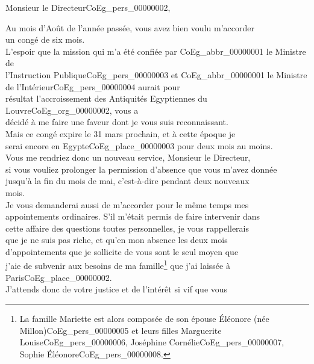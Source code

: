 \documentclass{book}
\begin{document}
\hspace{1cm} Monsieur le Directeur\gls{CoEg_pers_00000002},\\

\par Au mois d’Août de l’année passée, vous avez bien voulu m’accorder\\
un congé de six mois.\\
\indent L’espoir que la mission qui m’a été confiée par \gls{CoEg_abbr_00000001} le Ministre de
\\l’Instruction Publique\gls{CoEg_pers_00000003} et \gls{CoEg_abbr_00000001} le Ministre de l’Intérieur\gls{CoEg_pers_00000004} aurait pour\\
résultat l’accroissement des Antiquités Egyptiennes du Louvre\gls{CoEg_org_00000002}, vous a\\
décidé à me faire une faveur dont je vous suis reconnaissant.\\
\indent Mais ce congé expire le 31 mars prochain, et à cette époque je\\
serai encore en Egypte\gls{CoEg_place_00000003} pour deux mois au moins.\\
\indent Vous me rendriez donc un nouveau service, Monsieur le Directeur,\\
si vous vouliez prolonger la permission d’absence que vous m’avez donnée\\
jusqu’à la fin du mois de mai, c’est-à-dire pendant deux nouveaux\\
mois.\\
\indent Je vous demanderai aussi de m’accorder pour le même temps mes\\
appointements ordinaires. S’il m’était permis de faire intervenir dans\\
cette affaire des questions toutes personnelles, je vous rappellerais\\
que je ne suis pas riche, et qu’en mon absence les deux mois\\
d’appointements que je sollicite de vous sont le seul moyen que\\
j’aie de subvenir aux besoins de ma famille\footnote{La famille Mariette est alors composée de son épouse Éléonore (née Millon)\gls{CoEg_pers_00000005} et leurs filles Marguerite Louise\gls{CoEg_pers_00000006}, Joséphine Cornélie\gls{CoEg_pers_00000007}, Sophie Éléonore\gls{CoEg_pers_00000008}.} que j’ai laissée à Paris\gls{CoEg_place_00000002}.\\
\indent J’attends donc de votre justice et de l’intérêt si vif que vous\\
\end{document}
